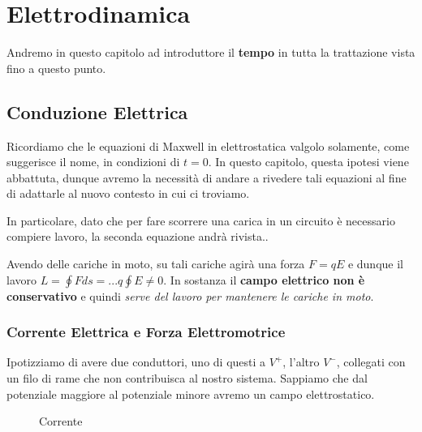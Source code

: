 \chapter{Elettrodinamica}

Andremo in questo capitolo ad introduttore il \textbf{tempo} in tutta la trattazione vista fino a questo punto. 

\section{Conduzione Elettrica}
Ricordiamo che le equazioni di Maxwell in elettrostatica valgolo solamente, come suggerisce il nome, in condizioni di $t = 0$. In questo capitolo, questa ipotesi viene abbattuta, dunque avremo la necessità di andare a rivedere tali equazioni al fine di adattarle al nuovo contesto in cui ci troviamo. 

In particolare, dato che per fare scorrere una carica in un circuito è necessario compiere lavoro, la seconda equazione andrà rivista..

Avendo delle cariche in moto, su tali cariche agirà una forza $F = qE$ e dunque il lavoro $L = \oint F ds = ... q\oint E \ne 0$. In sostanza il \textbf{campo elettrico non è conservativo} e quindi \textit{serve del lavoro per mantenere le cariche in moto}. 

\subsection{Corrente Elettrica e Forza Elettromotrice}
Ipotizziamo di avere due conduttori, uno di questi a $V^+$, l'altro $V^-$, collegati con un filo di rame che non contribuisca al nostro sistema. Sappiamo che dal potenziale maggiore al potenziale minore avremo un campo elettrostatico. 

\begin{figure}[H]
	\centering
\label{fig:corrente}
\caption{Corrente}
\end{figure}

